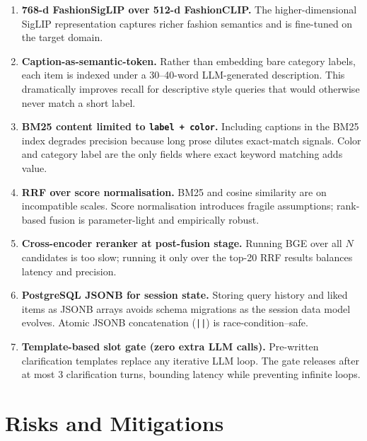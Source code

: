 \documentclass[12pt,a4paper]{article}
\begin{document}
\begin{enumerate}[leftmargin=*, label=\textbf{D\arabic*.}]

  \item \textbf{768-d FashionSigLIP over 512-d FashionCLIP.}
  The higher-dimensional SigLIP representation captures richer
  fashion semantics and is fine-tuned on the target domain.

  \item \textbf{Caption-as-semantic-token.}
  Rather than embedding bare category labels, each item is indexed
  under a 30–40-word LLM-generated description. This dramatically
  improves recall for descriptive style queries that would otherwise
  never match a short label.

  \item \textbf{BM25 content limited to \texttt{label + color}.}
  Including captions in the BM25 index degrades precision because
  long prose dilutes exact-match signals. Color and category label
  are the only fields where exact keyword matching adds value.

  \item \textbf{RRF over score normalisation.}
  BM25 and cosine similarity are on incompatible scales.
  Score normalisation introduces fragile assumptions; rank-based
  fusion is parameter-light and empirically robust.

  \item \textbf{Cross-encoder reranker at post-fusion stage.}
  Running BGE over all $N$ candidates is too slow; running it only
  over the top-20 RRF results balances latency and precision.

  \item \textbf{PostgreSQL JSONB for session state.}
  Storing query history and liked items as JSONB arrays avoids
  schema migrations as the session data model evolves.
  Atomic JSONB concatenation (\texttt{||}) is race-condition–safe.

  \item \textbf{Template-based slot gate (zero extra LLM calls).}
  Pre-written clarification templates replace any iterative LLM
  loop. The gate releases after at most 3 clarification turns,
  bounding latency while preventing infinite loops.

\end{enumerate}

\section{Risks and Mitigations}
\label{sec:risks}
\end{document}
